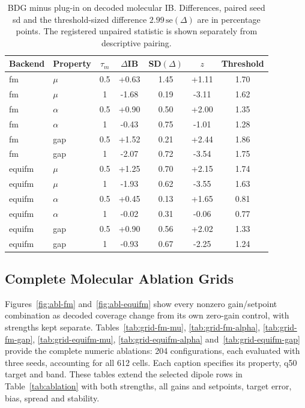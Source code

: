 \documentclass{article}
\begin{document}
\begin{table}[!htbp]
\centering\small
\caption{BDG minus plug-in on decoded molecular IB. Differences, paired seed sd and the threshold-sized difference $2.99\,\mathrm{se}(\Delta)$ are in percentage points. The registered unpaired statistic is shown separately from descriptive pairing.}
\label{tab:contrasts}
\begin{tabular}{llccccc}
\toprule
Backend & Property & $\tau_m$ & $\Delta$IB & SD$(\Delta)$ & $z$ & Threshold\\
\midrule
fm & $\mu$ & 0.5 & +0.63 & 1.45 & +1.11 & 1.70\\
fm & $\mu$ & 1 & -1.68 & 0.19 & -3.11 & 1.62\\
fm & $\alpha$ & 0.5 & +0.90 & 0.50 & +2.00 & 1.35\\
fm & $\alpha$ & 1 & -0.43 & 0.75 & -1.01 & 1.28\\
fm & gap & 0.5 & +1.52 & 0.21 & +2.44 & 1.86\\
fm & gap & 1 & -2.07 & 0.72 & -3.54 & 1.75\\
equifm & $\mu$ & 0.5 & +1.25 & 0.70 & +2.15 & 1.74\\
equifm & $\mu$ & 1 & -1.93 & 0.62 & -3.55 & 1.63\\
equifm & $\alpha$ & 0.5 & +0.45 & 0.13 & +1.65 & 0.81\\
equifm & $\alpha$ & 1 & -0.02 & 0.31 & -0.06 & 0.77\\
equifm & gap & 0.5 & +0.90 & 0.56 & +2.02 & 1.33\\
equifm & gap & 1 & -0.93 & 0.67 & -2.25 & 1.24\\
\bottomrule
\end{tabular}
\end{table}

\subsection{Complete Molecular Ablation Grids}\label{app:ablations}
Figures~\ref{fig:abl-fm} and~\ref{fig:abl-equifm} show every nonzero gain/setpoint combination as decoded coverage change from its own zero-gain control, with strengths kept separate. Tables~\ref{tab:grid-fm-mu}, \ref{tab:grid-fm-alpha}, \ref{tab:grid-fm-gap}, \ref{tab:grid-equifm-mu}, \ref{tab:grid-equifm-alpha} and~\ref{tab:grid-equifm-gap} provide the complete numeric ablations: 204 configurations, each evaluated with three seeds, accounting for all 612 cells. Each caption specifies its property, q50 target and band. These tables extend the selected dipole rows in Table~\ref{tab:ablation} with both strengths, all gains and setpoints, target error, bias, spread and stability.
\end{document}
